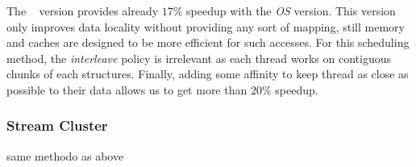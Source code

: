 The \TABARNAC~ version provides already $17\%$ speedup with the
\emph{OS} version. This version only improves data locality without providing
any sort of mapping, still memory and caches are designed to be more efficient
for such accesses. For this scheduling method, the \emph{interleave} policy is
irrelevant as each thread works on contiguous chunks of each structures.
Finally, adding some affinity to keep thread as close as possible to their
data allows us to get more than $20\%$ speedup.


\subsubsection{Stream Cluster}
same methodo as above

